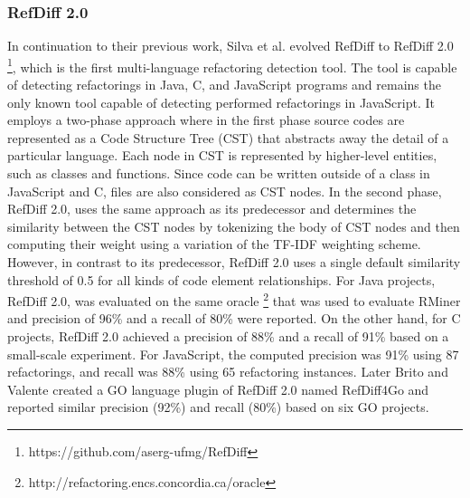 \documentclass[letterpaper,12pt,onecolumn,final]{report}
\begin{document}
\subsubsection{RefDiff 2.0}
In continuation to their previous work, Silva et al. \cite{Silva2020} evolved RefDiff \cite{Silva2017} to RefDiff 2.0 \footnote{https://github.com/aserg-ufmg/RefDiff}, which is the first multi-language refactoring detection tool. The tool is capable of detecting refactorings in Java, C, and JavaScript programs and remains the only known tool capable of detecting performed refactorings in JavaScript. It employs a two-phase approach where in the first phase source codes are represented as a Code Structure Tree (CST) that abstracts away the detail of a particular language. Each node in CST is represented by higher-level entities, such as classes and functions. Since code can be written outside of a class in JavaScript and C, files are also considered as CST nodes. In the second phase, RefDiff 2.0, uses the same approach as its predecessor and determines the similarity between the CST nodes by tokenizing the body of CST nodes and then computing their weight using a variation of the TF-IDF weighting scheme. However, in contrast to its predecessor, RefDiff 2.0 uses a single default similarity threshold of 0.5 for all kinds of code element relationships. For Java projects, RefDiff 2.0, was evaluated on the same oracle \cite{Tsantalis2018} \footnote{http://refactoring.encs.concordia.ca/oracle} that was used to evaluate RMiner \cite{Tsantalis2018} and precision of 96\% and a recall of 80\% were reported. On the other hand, for C projects, RefDiff 2.0 achieved a precision of 88\% and a recall of 91\% based on a small-scale experiment. For JavaScript, the computed precision was 91\% using 87 refactorings, and recall was 88\% using 65 refactoring instances. Later Brito and Valente \cite{Brito2020} created a GO language plugin of RefDiff 2.0 named RefDiff4Go and reported similar precision (92\%) and recall (80\%) based on six GO projects.
\end{document}
